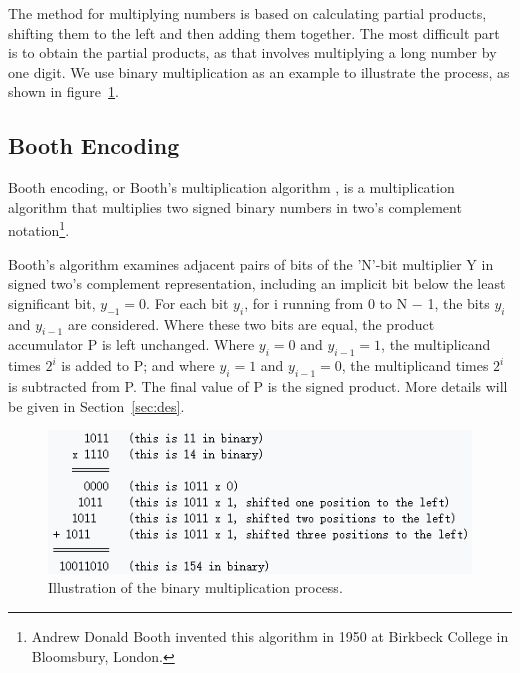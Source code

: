 \documentclass[twoside,twocolumn]{article}
\begin{document}
The method for multiplying numbers is based on calculating partial products, shifting them to the left and then adding them together. The most difficult part is to obtain the partial products, as that involves multiplying a long number by one digit. We use binary multiplication as an example to illustrate the process, as shown in figure~\ref{fig:mul}.

\subsection{Booth Encoding}

Booth encoding, or Booth's multiplication algorithm \cite{bo_en}, is a multiplication algorithm that multiplies two signed binary numbers in two's complement notation\footnote{Andrew Donald Booth invented this algorithm in 1950 at Birkbeck College in Bloomsbury, London.}.

Booth's algorithm examines adjacent pairs of bits of the 'N'-bit multiplier Y in signed two's complement representation, including an implicit bit below the least significant bit, $\displaystyle y_{-1} = 0$. For each bit $\displaystyle y_i$, for i running from 0 to N − 1, the bits $\displaystyle y_i$ and $\displaystyle y_{i-1}$ are considered. Where these two bits are equal, the product accumulator P is left unchanged. Where $\displaystyle y_i = 0$ and $\displaystyle y_{i-1} = 1$, the multiplicand times $\displaystyle 2^i$ is added to P; and where $\displaystyle y_i = 1$ and $\displaystyle y_{i-1} = 0$, the multiplicand times $\displaystyle 2^i$ is subtracted from P. The final value of P is the signed product. More details will be given in Section~\ref{sec:des}.

\begin{figure}
	\centering
	\includegraphics[width=1.0\columnwidth, clip=true]{fig/mul.png}
	\vspace{-4mm}
	\caption{Illustration of the binary multiplication process.}
	\label{fig:mul}
	\vspace{-5mm}
\end{figure}
\end{document}
